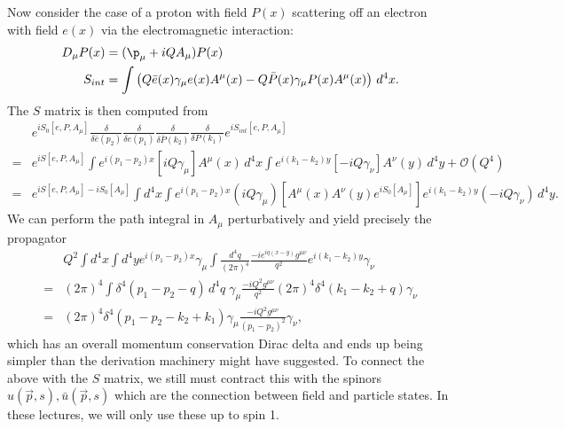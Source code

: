 \documentclass[a4paper, 11pt, normalem]{report}
\begin{document}
Now consider the case of a proton with field $P(x)$ scattering off an electron with field $e(x)$ via the electromagnetic interaction:
\begin{align}
    D_\mu P(x) &= (\p_\mu+iQA_\mu)P(x) \\
    S_{int} &= \int \left(Q\bar{e}(x)\gamma_\mu e(x)A^\mu(x) - Q\bar{P}(x)\gamma_\mu P(x)A^\mu(x)\right)\,d^4x.
\end{align}
The $S$ matrix is then computed from
\begin{equation}
    \begin{split}
        &e^{iS_0[e,P,A_\mu]}\frac{\delta}{\delta\bar{e}(p_2)}\frac{\delta}{\delta e(p_1)}\frac{\delta}{\delta\bar{P}(k_2)}\frac{\delta}{\delta P(k_1)}e^{iS_{int}[e,P,A_\mu]} \\
        =&e^{iS[e,P,A_\mu]}\int e^{i(p_1-p_2)x}[iQ\gamma_\mu]A^\mu(x)\,d^4x \int e^{i(k_1-k_2)y}[-iQ\gamma_\nu]A^\nu(y)\,d^4y + \mathcal{O}(Q^4) \\
        =&e^{iS[e,P,A_\mu]-iS_0[A_\mu]}\int d^4x \int e^{i(p_1-p_2)x}(iQ\gamma_\mu)\left[A^\mu(x)A^\nu(y)e^{iS_0[A_\mu]}\right]e^{i(k_1-k_2)y}(-iQ\gamma_\nu)\,d^4y.
    \end{split}
\end{equation}
We can perform the path integral in $A_\mu$ perturbatively and yield precisely the propagator
\begin{equation}
    \begin{split}
        &Q^2\int d^4x \int d^4y e^{i(p_1-p_2)x}\gamma_\mu \int \frac{d^4q}{(2\pi)^4}\frac{-ie^{iq(x-y)}g^{\mu\nu}}{q^2}e^{i(k_1-k_2)y}\gamma_\nu \\
        =&(2\pi)^4 \int \delta^4(p_1-p_2-q)\,d^4q\; \gamma_\mu\frac{-iQ^2g^{\mu\nu}}{q^2}(2\pi)^4\delta^4(k_1-k_2+q)\gamma_\nu \\
        =&(2\pi)^4\delta^4(p_1-p_2-k_2+k_1)\gamma_\mu\frac{-iQ^2g^{\mu\nu}}{(p_1-p_2)^2}\gamma_\nu,
    \end{split}
\end{equation}
which has an overall momentum conservation Dirac delta and ends up being simpler than the derivation machinery might have suggested.
To connect the above with the $S$ matrix, we still must contract this with the spinors $u(\vec{p},s),\bar{u}(\vec{p},s)$ which are the connection between field and particle states.
In these lectures, we will only use these up to spin 1.
\end{document}
